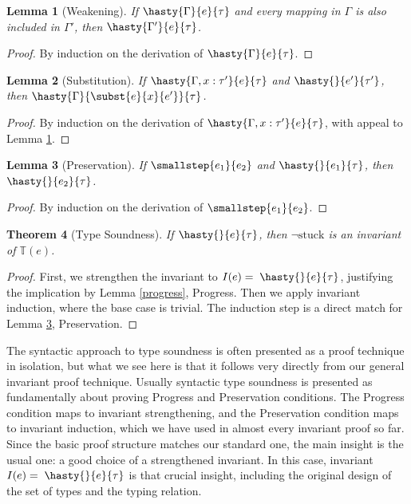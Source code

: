 \documentclass{amsbook}
\newtheorem{theorem}{Theorem}[chapter]
\newtheorem{lemma}[theorem]{Lemma}
\theoremstyle{definition}
\theoremstyle{remark}
\numberwithin{section}{chapter}
\numberwithin{equation}{chapter}
\begin{document}
\begin{lemma}[Weakening]\label{weakening}
  If $\hasty{\Gamma}{e}{\tau}$ and every mapping in $\Gamma$ is also included in $\Gamma'$, then $\hasty{\Gamma'}{e}{\tau}$.
\end{lemma}
\begin{proof}
  By induction on the derivation of $\hasty{\Gamma}{e}{\tau}$.
\end{proof}

\begin{lemma}[Substitution]\label{substitution}
  If $\hasty{\Gamma, x : \tau'}{e}{\tau}$ and $\hasty{}{e'}{\tau'}$, then $\hasty{\Gamma}{\subst{e}{x}{e'}}{\tau}$.
\end{lemma}
\begin{proof}
  By induction on the derivation of $\hasty{\Gamma, x: \tau'}{e}{\tau}$, with appeal to Lemma \ref{weakening}.
\end{proof}

\begin{lemma}[Preservation]\label{preservation}
  If $\smallstep{e_1}{e_2}$ and $\hasty{}{e_1}{\tau}$, then $\hasty{}{e_2}{\tau}$.
\end{lemma}
\begin{proof}
  By induction on the derivation of $\smallstep{e_1}{e_2}$.
\end{proof}

\invariants
\begin{theorem}[Type Soundness]
  If $\hasty{}{e}{\tau}$, then $\neg \textrm{stuck}$ is an invariant of $\mathbb T(e)$.
\end{theorem}
\begin{proof}
  First, we strengthen the invariant to $I(e) = \; \hasty{}{e}{\tau}$, justifying the implication by Lemma \ref{progress}, Progress.
  Then we apply invariant induction, where the base case is trivial.
  The induction step is a direct match for Lemma \ref{preservation}, Preservation.
\end{proof}

The syntactic approach to type soundness is often presented as a proof technique in isolation, but what we see here is that it follows very directly from our general invariant proof technique.
Usually syntactic type soundness is presented as fundamentally about proving Progress and Preservation conditions.
The Progress condition maps to invariant strengthening, and the Preservation condition maps to invariant induction, which we have used in almost every invariant proof so far.
Since the basic proof structure matches our standard one, the main insight is the usual one: a good choice of a strengthened invariant.
In this case, invariant $I(e) = \; \hasty{}{e}{\tau}$ is that crucial insight, including the original design of the set of types and the typing relation.
\end{document}

